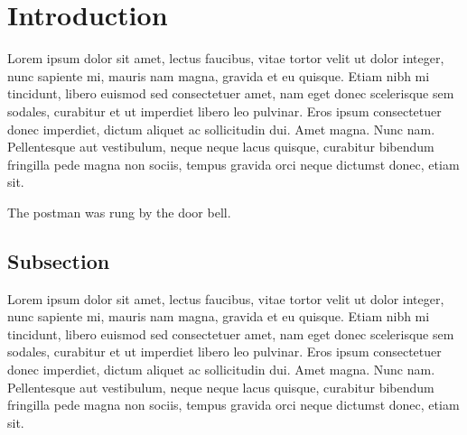 \documentclass[letterpaper, 12pt, dvips]{mitwpl}
\begin{document}


\author{Noam Chomsky\\Morris Halle}

\maketitle


\section{Introduction}
\label{sec:intro}

Lorem ipsum dolor sit amet, lectus faucibus, vitae tortor velit ut dolor integer, nunc sapiente mi, mauris nam magna, gravida et eu quisque. Etiam nibh mi tincidunt, libero euismod sed consectetuer amet, nam eget donec scelerisque sem sodales, curabitur et ut imperdiet libero leo pulvinar. Eros ipsum consectetuer donec imperdiet, dictum aliquet ac sollicitudin dui. Amet magna. Nunc nam. Pellentesque aut vestibulum, neque neque lacus quisque, curabitur bibendum fringilla pede magna non sociis, tempus gravida orci neque dictumst donec, etiam sit.

\begin{exe}
	\ex The postman was rung by the door bell.
\end{exe}

\subsection{Subsection}

Lorem ipsum dolor sit amet, lectus faucibus, vitae tortor velit ut dolor integer, nunc sapiente mi, mauris nam magna, gravida et eu quisque. Etiam nibh mi tincidunt, libero euismod sed consectetuer amet, nam eget donec scelerisque sem sodales, curabitur et ut imperdiet libero leo pulvinar. Eros ipsum consectetuer donec imperdiet, dictum aliquet ac sollicitudin dui. Amet magna. Nunc nam. Pellentesque aut vestibulum, neque neque lacus quisque, curabitur bibendum fringilla pede magna non sociis, tempus gravida orci neque dictumst donec, etiam sit. \citep{MacFarlane:2005}
\end{document}
